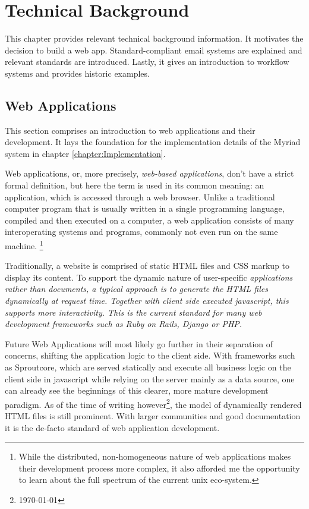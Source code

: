 \chapter{Technical Background}
\label{chapter:Technical}

This chapter provides relevant technical background information. It motivates the decision to build a web app. Standard-compliant email systems are explained and relevant standards are introduced. Lastly, it gives an introduction to workflow systems and provides historic examples.

\section{Web Applications}

This section comprises an introduction to web applications and their development. It lays the foundation for the implementation details of the Myriad system in chapter \autoref{chapter:Implementation}.

Web applications, or, more precisely, \emph{web-based applications}, don't have a strict formal definition, but here the term is used in its common meaning\cite{webapptrends}: an application, which is accessed through a web browser. Unlike a traditional computer program that is usually written in a single programming language, compiled and then executed on a computer, a web application consists of many interoperating systems and programs, commonly not even run on the same machine. \footnote{While the distributed, non-homogeneous nature of web applications makes their development process more complex, it also afforded me the opportunity to learn about the full spectrum of the current unix eco-system.}

Traditionally, a website is comprised of static HTML files and CSS markup to display its content. To support the dynamic nature of user-specific \em{applications} rather than \em{documents}, a typical approach is to generate the HTML files dynamically at request time. Together with client side executed javascript, this supports more interactivity. This is the current standard for many web development frameworks such as Ruby on Rails, Django or PHP.

Future Web Applications will most likely go further in their separation of concerns, shifting the application logic to the client side. With frameworks such as Sproutcore, which are served statically and execute all business logic on the client side in javascript while relying on the server mainly as a data source, one can already see the beginnings of this clearer, more mature development paradigm. As of the time of writing however\footnote{ \today }, the model of dynamically rendered HTML files is still prominent. With larger communities and good documentation it is the de-facto standard of web application development.

